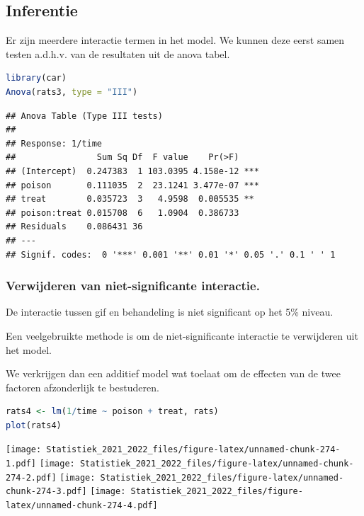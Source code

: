 \documentclass[
  12pt,dutch,coursenotes]{book}
\theoremstyle{definition}
\theoremstyle{definition}
\theoremstyle{definition}
\theoremstyle{definition}
\theoremstyle{remark}
\begin{document}
\hypertarget{inferentie}{%
\subsection{Inferentie}\label{inferentie}}

Er zijn meerdere interactie termen in het model.
We kunnen deze eerst samen testen a.d.h.v. van de resultaten uit de anova tabel.

\begin{lstlisting}[language=R]
library(car)
Anova(rats3, type = "III")
\end{lstlisting}

\begin{lstlisting}
## Anova Table (Type III tests)
## 
## Response: 1/time
##                Sum Sq Df  F value    Pr(>F)    
## (Intercept)  0.247383  1 103.0395 4.158e-12 ***
## poison       0.111035  2  23.1241 3.477e-07 ***
## treat        0.035723  3   4.9598  0.005535 ** 
## poison:treat 0.015708  6   1.0904  0.386733    
## Residuals    0.086431 36                       
## ---
## Signif. codes:  0 '***' 0.001 '**' 0.01 '*' 0.05 '.' 0.1 ' ' 1
\end{lstlisting}

\hypertarget{verwijderen-van-niet-significante-interactie.}{%
\subsubsection{Verwijderen van niet-significante interactie.}\label{verwijderen-van-niet-significante-interactie.}}

De interactie tussen gif en behandeling is niet significant op het 5\% niveau.

Een veelgebruikte methode is om de niet-significante interactie te verwijderen uit het model.

We verkrijgen dan een additief model wat toelaat om de effecten van de twee factoren afzonderlijk te bestuderen.

\begin{lstlisting}[language=R]
rats4 <- lm(1/time ~ poison + treat, rats)
plot(rats4)
\end{lstlisting}

\texttt{[image: Statistiek\_2021\_2022\_files/figure-latex/unnamed-chunk-274-1.pdf]} \texttt{[image: Statistiek\_2021\_2022\_files/figure-latex/unnamed-chunk-274-2.pdf]} \texttt{[image: Statistiek\_2021\_2022\_files/figure-latex/unnamed-chunk-274-3.pdf]} \texttt{[image: Statistiek\_2021\_2022\_files/figure-latex/unnamed-chunk-274-4.pdf]}
\end{document}
